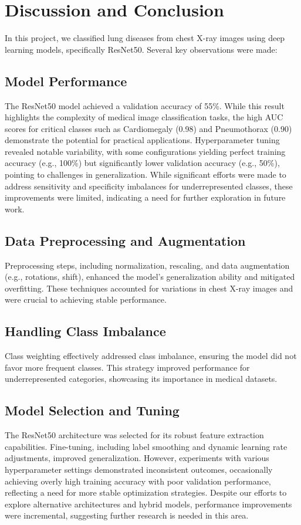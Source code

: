 \documentclass[journal]{IEEEtran}
\begin{document}
\section{Discussion and Conclusion}

In this project, we classified lung diseases from chest X-ray images using deep learning models, specifically ResNet50. Several key observations were made:

\subsection{Model Performance}
The ResNet50 model achieved a validation accuracy of 55\%. While this result highlights the complexity of medical image classification tasks, the high AUC scores for critical classes such as Cardiomegaly (0.98) and Pneumothorax (0.90) demonstrate the potential for practical applications. Hyperparameter tuning revealed notable variability, with some configurations yielding perfect training accuracy (e.g., 100\%) but significantly lower validation accuracy (e.g., 50\%), pointing to challenges in generalization. While significant efforts were made to address sensitivity and specificity imbalances for underrepresented classes, these improvements were limited, indicating a need for further exploration in future work.

\subsection{Data Preprocessing and Augmentation}
Preprocessing steps, including normalization, rescaling, and data augmentation (e.g., rotations, shift), enhanced the model's generalization ability and mitigated overfitting. These techniques accounted for variations in chest X-ray images and were crucial to achieving stable performance.

\subsection{Handling Class Imbalance}
Class weighting effectively addressed class imbalance, ensuring the model did not favor more frequent classes. This strategy improved performance for underrepresented categories, showcasing its importance in medical datasets.

\subsection{Model Selection and Tuning}
The ResNet50 architecture was selected for its robust feature extraction capabilities. Fine-tuning, including label smoothing and dynamic learning rate adjustments, improved generalization. However, experiments with various hyperparameter settings demonstrated inconsistent outcomes, occasionally achieving overly high training accuracy with poor validation performance, reflecting a need for more stable optimization strategies. Despite our efforts to explore alternative architectures and hybrid models, performance improvements were incremental, suggesting further research is needed in this area.
\end{document}
